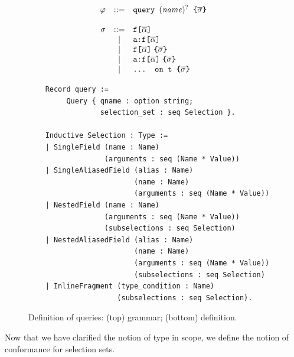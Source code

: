 \begin{figure}[t]
  \centering

  \begin{displaymath}
  \begin{array}{rcl}
  \varphi & ::= & \texttt{query } (\mathit{name})^{?} \texttt{ \{}  \overline{\sigma} \texttt{\}} \\
  && \\
  \sigma & ::= & \texttt{f[}\overline{\alpha}\texttt{]} \\
  & | & \texttt{a:}\texttt{f[}\overline{\alpha}\texttt{]} \\    
  & | & \texttt{f[}\overline{\alpha}\texttt{]}\; \texttt{\{}\overline{\sigma}\texttt{\}} \\
  & | & \texttt{a:}\texttt{f[}\overline{\alpha}\texttt{]}\; \texttt{\{}\overline{\sigma}\texttt{\}} \\
  & | & \texttt{... on t \{}\overline{\sigma}\texttt{\}} \\
  \end{array}
  \end{displaymath}
 
    \begin{verbatim}
    Record query := 
         Query { qname : option string; 
                 selection_set : seq Selection }.
                   
    Inductive Selection : Type :=
    | SingleField (name : Name)
                  (arguments : seq (Name * Value))
    | SingleAliasedField (alias : Name)
                         (name : Name)
                         (arguments : seq (Name * Value))
    | NestedField (name : Name)
                  (arguments : seq (Name * Value))
                  (subselections : seq Selection)
    | NestedAliasedField (alias : Name)
                         (name : Name)
                         (arguments : seq (Name * Value))
                         (subselections : seq Selection)
    | InlineFragment (type_condition : Name)
                     (subselections : seq Selection).
    \end{verbatim}

   \caption{Definition of \gql queries:
  (top) \spec grammar; 
  (bottom) \gcoql definition. %
  } 
  \label{fig:query_def}
\end{figure}




Now that we have clarified the notion of type in scope, we 
define the notion of conformance for selection sets.

